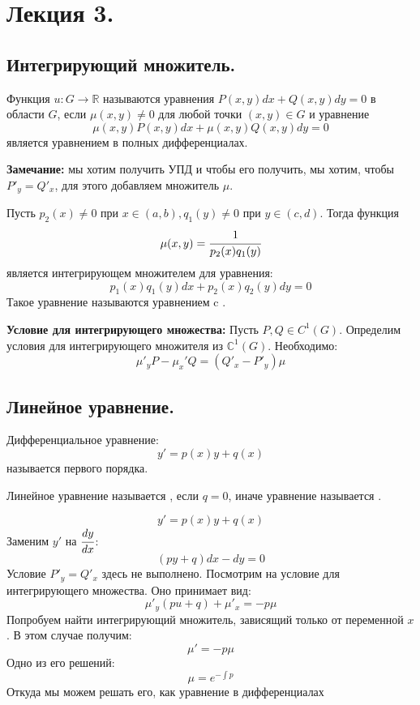 \section{Лекция 3.}

\subsection{Интегрирующий множитель.}

 Функция $u: G \rightarrow \mathbb{R}$ называются  уравнения $P(x,y) dx + Q(x,y) dy =0$ в области $G$, если $\mu(x,y)\neq 0$ для любой точки $(x,y) \in G$ и уравнение
$$\mu(x,y)P(x,y)dx +   \mu(x,y) Q(x,y)dy = 0$$
является уравнением в полных дифференциалах.

\textbf{Замечание:} мы хотим получить УПД и чтобы его получить, мы хотим, чтобы $P'_y = Q'_x$, для этого добавляем множитель $\mu$.


 Пусть $p_2(x) \neq 0$ при $x\in (a,b), q_1(y) \neq  0 $ при $y \in (c,d)$. Тогда функция
$$\mu(x,y) = \cfrac{1}{p_2(x) q_1(y)}$$
является интегрирующем множителем для уравнения:
$$p_1(x) q_1(y)dx  + p_2(x) q_2(y) dy = 0$$
Такое уравнение называются уравнением c .


\textbf{Условие для интегрирующего множества:} Пусть $P,Q \in C^1(G)$. Определим условия для интегрирующего множителя из $\mathbb{C}^1(G)$. Необходимо:
$$\mu'_y P - \mu_x'Q = (Q'_x - P'_y)\mu$$

\subsection{Линейное уравнение.}

 Дифференциальное уравнение:
$$y' = p(x) y  + q(x)$$
называется  первого порядка.

 Линейное уравнение называется , если $q=0$, иначе уравнение называется .

$$y' = p(x) y + q(x)$$
Заменим $y'$ на $\cfrac{dy}{dx}$:
$$(py+q) dx - dy = 0$$
Условие $P'_y =Q'_x$ здесь не выполнено. Посмотрим на условие для интегрирующего множества. Оно принимает вид:
$$\mu'_y(pu+q) + \mu'_x = -p \mu$$
Попробуем найти интегрирующий множитель, зависящий только от переменной $x$. В этом случае получим:
$$\mu'=-p\mu$$
Одно из его решений:
$$\mu = e^{-\int p}$$
Откуда мы можем решать его, как уравнение в дифференциалах

